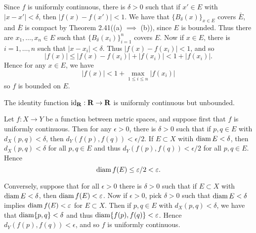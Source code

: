 \begin{ex}
Since $f$ is uniformly continuous, there is $\delta > 0$ such that if $x' \in E$ with $|x-x'| < \delta$, then $|f(x) - f(x')| < 1$. We have that $\{B_{\delta}(x)\}_{x \in E}$ covers $\bar{E}$, and $\bar{E}$ is compact by Theorem 2.41((a) $\implies$ (b)), since $E$ is bounded. Thus there are $x_1, \ldots, x_n \in E$ such that $\{B_{\delta}(x_i)\}_{i = 1}^n$ covers $E$. Now if $x \in E$, there is $i = 1, \ldots, n$ such that $|x - x_i| < \delta$. Thus $|f(x) - f(x_i)| < 1$, and so \[|f(x)| \leq |f(x) - f(x_i)| + |f(x_i)| < 1 + |f(x_i)|.\] Hence for any $x \in E$, we have \[|f(x)| < 1 + \max_{1 \leq i \leq n}|f(x_i)|\] so $f$ is bounded on $E$.

The identity function $\operatorname{id}_{\mathbf{R}}: \mathbf{R} \to \mathbf{R}$ is uniformly continuous but unbounded.
\end{ex}

\begin{ex}
Let $f: X \to Y$ be a function between metric spaces, and suppose first that $f$ is uniformly continuous. Then for any $\epsilon > 0$, there is $\delta > 0$ such that if $p, q \in E$ with $d_X(p, q) < \delta$, then $d_Y(f(p), f(q)) < \epsilon/2$. If $E \subset X$ witih $\operatorname{diam} E < \delta$, then $d_X(p, q) < \delta$ for all $p, q \in E$ and thus $d_Y(f(p), f(q)) < \epsilon/2$ for all $p, q \in E$. Hence \[\operatorname{diam} f(E) \leq \varepsilon/2 < \varepsilon.\]

Conversely, suppose that for all $\epsilon > 0$ there is $\delta > 0$ such that if $E \subset X$ with $\operatorname{diam} E < \delta$, then $\operatorname{diam} f(E) < \varepsilon$. Now if $\epsilon > 0$, pick $\delta > 0$ such that $\operatorname{diam} E < \delta$ implies $\operatorname{diam} f(E) < \varepsilon$ for $E \subset X$. Then if $p, q \in E$ with $d_X(p, q) < \delta$, we have that $\operatorname{diam}\{p, q\} < \delta$ and thus $\operatorname{diam}\{f(p), f(q)\} < \varepsilon$. Hence $d_Y(f(p), f(q)) < \epsilon$, and so $f$ is uniformly continuous.
\end{ex}

